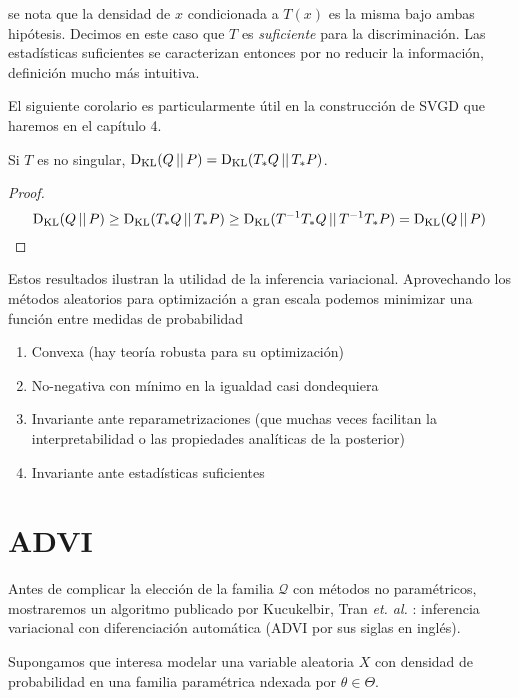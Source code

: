 \documentclass[main.tex]{subfiles}
\begin{document}
se nota que la densidad de $x$ condicionada a $T(x)$ es la misma bajo ambas
hipótesis. Decimos en este caso que $T$ es \textit{suficiente} para la
discriminación. Las estadísticas suficientes se caracterizan entonces por no
reducir la información, definición mucho más intuitiva.

El siguiente corolario es particularmente útil en la construcción de SVGD
que haremos en el capítulo 4.
\begin{corollary}\label{cor:invar-invert}
	Si $T$ es no singular, $\operatorname*{D_{KL}}(Q \operatorname*{\mid\mid} P) = \operatorname*{D_{KL}}(T_*Q \operatorname*{\mid\mid} T_*P)$. 
\end{corollary}
\begin{proof}
	\begin{equation*}
		\operatorname*{D_{KL}}(Q \operatorname*{\mid\mid} P) \geq \operatorname*{D_{KL}}(T_*Q \operatorname*{\mid\mid} T_*P) \geq 
		\operatorname*{D_{KL}}(T^{-1}T_*Q \operatorname*{\mid\mid} T^{-1}T_*P) = \operatorname*{D_{KL}}(Q\operatorname*{\mid\mid} P)
	\end{equation*}
\end{proof}

Estos resultados ilustran la utilidad de la inferencia variacional. Aprovechando
los métodos aleatorios para optimización a gran escala podemos minimizar una
función entre medidas de probabilidad
\begin{enumerate}[label=\roman*.]
	\item Convexa (hay teoría robusta para su optimización)
	\item No-negativa con mínimo en la igualdad casi dondequiera
	\item Invariante ante reparametrizaciones (que muchas veces facilitan la
	interpretabilidad o las propiedades analíticas de la posterior)
	\item Invariante ante estadísticas suficientes
\end{enumerate}

\section{ADVI}\label{sec:advi}
Antes de complicar la elección de la familia $\mathcal{Q}$ con métodos no
paramétricos, mostraremos un algoritmo publicado por Kucukelbir, Tran
\textit{et. al.} \cite{advi}: inferencia variacional con diferenciación
automática (ADVI por sus siglas en inglés). 

 Supongamos que interesa modelar una variable aleatoria $X$ con densidad de
 probabilidad en una familia paramétrica ndexada por $\theta \in \Theta$. 
\end{document}
